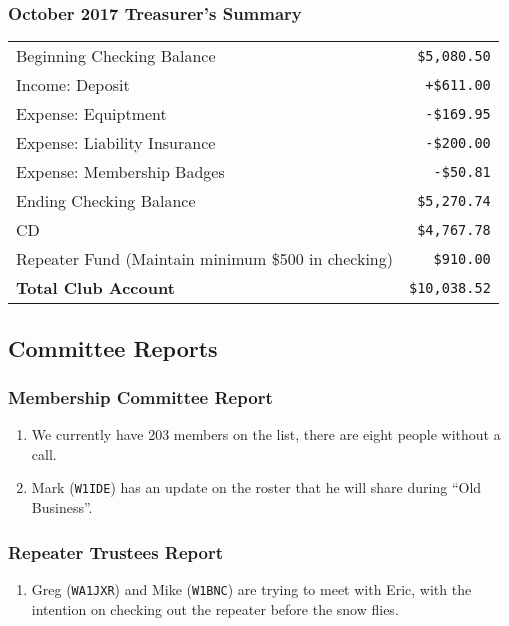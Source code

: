 \documentclass[10pt,letterpaper]{article}
\begin{document}
\subsubsection{October 2017 Treasurer's Summary}
\noindent
\begin{tabular}{|l|r|}
  \hline
  Beginning Checking Balance & \texttt{\$5,080.50} \\
  Income: Deposit & \texttt{+\$611.00} \\
  Expense: Equiptment & \texttt{-\$169.95} \\
  Expense: Liability Insurance & \texttt{-\$200.00} \\
  Expense: Membership Badges & \texttt{-\$50.81} \\
  Ending Checking Balance & \texttt{\$5,270.74} \\
  \hline
  \hline
  CD & \texttt{\$4,767.78} \\
  \hline
  \hline
  Repeater Fund (Maintain minimum \$500 in checking) & \texttt{\$910.00} \\
  \hline
  \hline
  \textbf{Total Club Account} & \texttt{\$10,038.52} \\
  \hline
\end{tabular}

\subsection{Committee Reports}

\subsubsection{Membership Committee Report}
\begin{enumerate}
  \item We currently have 203 members on the list, there are eight people without a call.
  \item Mark (\texttt{W1IDE}) has an update on the roster that he will share during ``Old Business''.
\end{enumerate}

\subsubsection{Repeater Trustees Report}
\begin{enumerate}
  \item Greg (\texttt{WA1JXR}) and Mike (\texttt{W1BNC}) are trying to meet with Eric, with the intention on checking out the repeater before the snow flies.
\end{enumerate}
\end{document}
